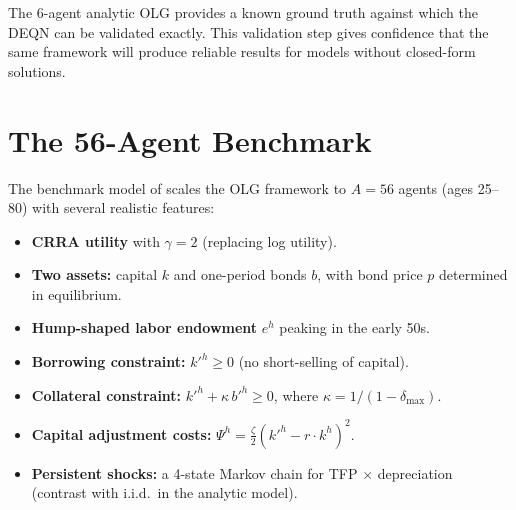 \documentclass[11pt,a4paper]{report}
\begin{document}
\begin{keyinsightbox}
The 6-agent analytic OLG provides a known ground truth against which the DEQN can be validated exactly.  This validation step gives confidence that the same framework will produce reliable results for models without closed-form solutions.
\end{keyinsightbox}

\section{The 56-Agent Benchmark}
\label{sec:olg_56}
\label{sec:olg_benchmark}

The benchmark model of \citet{azinovicDEEPEQUILIBRIUMNETS2022} scales the OLG framework to $A = 56$ agents (ages 25--80) with several realistic features:

\begin{itemize}[itemsep=2pt]
\item \textbf{CRRA utility} with $\gamma = 2$ (replacing log utility).
\item \textbf{Two assets:} capital $k$ and one-period bonds $b$, with bond price $p$ determined in equilibrium.
\item \textbf{Hump-shaped labor endowment} $e^h$ peaking in the early 50s.
\item \textbf{Borrowing constraint:} $k'^h \geq 0$ (no short-selling of capital).
\item \textbf{Collateral constraint:} $k'^h + \kappa\, b'^h \geq 0$, where $\kappa = 1/(1-\delta_{\max})$.
\item \textbf{Capital adjustment costs:} $\Psi^h = \frac{\zeta}{2}(k'^h - r\cdot k^h)^2$.
\item \textbf{Persistent shocks:} a 4-state Markov chain for TFP $\times$ depreciation (contrast with i.i.d.\ in the analytic model).
\end{itemize}
\end{document}

